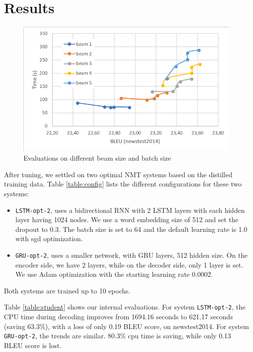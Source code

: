 \documentclass[11pt,a4paper]{article}
\begin{document}
\section{Results}

\begin{figure}
\includegraphics[width=\linewidth]{beambatch.png}
\caption{Evaluations on different beam size and batch size}
\label{fig:beam_batch_bleu}
\end{figure}

After tuning, we settled on two optimal NMT systems based on the
distilled training data. Table \ref{table:config}
lists the different configurations for these two systems:

\begin{itemize}
\item {\tt LSTM-opt-2}, uses a bidirectional RNN with 2 LSTM layers with each hidden layer having 1024 nodes.
We use a word embedding size of 512 and set the dropout to 0.3.
The batch size is set to 64 and the default learning rate is 1.0 with sgd optimization.
\item {\tt GRU-opt-2}, uses  a smaller network, with GRU layers, 512 hidden size.
On the encoder side, we have 2 layers, while on the decoder side, only 1 layer is set.
We use Adam optimization with the starting learning rate 0.0002.
\end{itemize}
Both systems are trained up to 10 epochs.

Table \ref{table:student} shows our internal evaluations.
For system {\tt LSTM-opt-2}, the CPU time during decoding improves from 1694.16 seconds to 621.17 seconds (saving 63.3\%), with a loss of only 0.19 BLEU score, on newstest2014.
For system {\tt GRU-opt-2}, the trends are similar.
80.3\% cpu time is saving, while only 0.13 BLEU score is lost.
\end{document}

